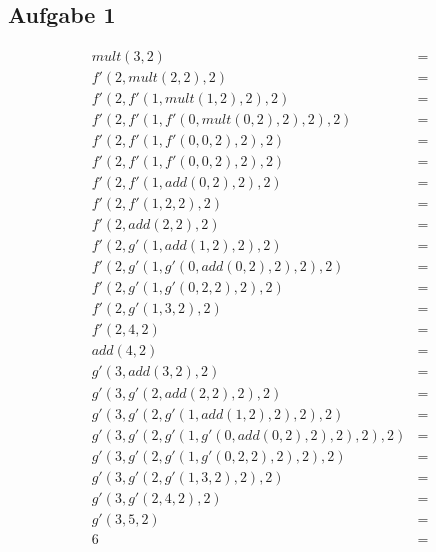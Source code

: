 \documentclass{report}
\begin{document}
\chapter{}

\section{Aufgabe 1}


\begin{eqnarray}
  mult\left(3,2\right) & = \nonumber \\
  f'\left(2,mult\left(2,2\right),2\right) & = \nonumber \\
  f'\left(2,f'\left(1,mult\left(1,2\right),2\right),2\right) & = \nonumber \\
  f'\left(2,f'\left(1,f'\left(0,mult\left(0,2\right),2\right),2\right),2\right) & = \nonumber \\
  f'\left(2,f'\left(1,f'\left(0,0,2\right),2\right),2\right) & = \nonumber \\
  f'\left(2,f'\left(1,f'\left(0,0,2\right),2\right),2\right) & = \nonumber \\
  f'\left(2,f'\left(1,add\left(0,2\right),2\right),2\right) & = \nonumber \\
  f'\left(2,f'\left(1,2,2\right),2\right) & = \nonumber \\
  f'\left(2,add\left(2,2\right),2\right) & = \nonumber \\
  f'\left(2,g'\left(1,add\left(1,2\right),2\right),2\right) & = \nonumber \\
  f'\left(2,g'\left(1,g'\left(0,add\left(0,2\right),2\right),2\right),2\right) & = \nonumber \\
  f'\left(2,g'\left(1,g'\left(0,2,2\right),2\right),2\right) & = \nonumber \\
  f'\left(2,g'\left(1,3,2\right),2\right) & = \nonumber \\
  f'\left(2,4,2\right) & = \nonumber \\
  add\left(4,2\right) & = \nonumber \\
  g'\left(3,add\left(3,2\right),2\right) & = \nonumber \\
  g'\left(3,g'\left(2,add\left(2,2\right),2\right),2\right) & = \nonumber \\
  g'\left(3,g'\left(2,g'\left(1,add\left(1,2\right),2\right),2\right),2\right) & = \nonumber \\
  g'\left(3,g'\left(2,g'\left(1,g'\left(0,add\left(0,2\right),2\right),2\right),2\right),2\right) & = \nonumber \\
  g'\left(3,g'\left(2,g'\left(1,g'\left(0,2,2\right),2\right),2\right),2\right) & = \nonumber \\
  g'\left(3,g'\left(2,g'\left(1,3,2\right),2\right),2\right) & = \nonumber \\
  g'\left(3,g'\left(2,4,2\right),2\right) & = \nonumber \\
  g'\left(3,5,2\right) & = \nonumber \\
  6 & = \nonumber
\end{eqnarray}
\end{document}
